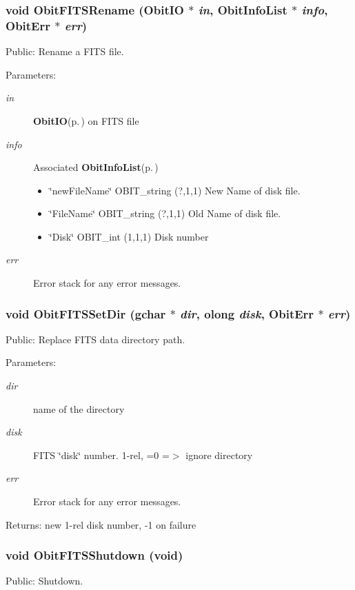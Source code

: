 \subsubsection{\setlength{\rightskip}{0pt plus 5cm}void Obit\-FITSRename ({\bf Obit\-IO} $\ast$ {\em in}, {\bf Obit\-Info\-List} $\ast$ {\em info}, {\bf Obit\-Err} $\ast$ {\em err})}\label{ObitFITS_8h_a11}


Public: Rename a FITS file. 

\begin{Desc}
\item[Parameters:]
\begin{description}
\item[{\em in}]{\bf Obit\-IO}{\rm (p.\,\pageref{structObitIO})} on FITS file \item[{\em info}]Associated {\bf Obit\-Info\-List}{\rm (p.\,\pageref{structObitInfoList})} \begin{itemize}
\item \char`\"{}new\-File\-Name\char`\"{} OBIT\_\-string (?,1,1) New Name of disk file. \item \char`\"{}File\-Name\char`\"{} OBIT\_\-string (?,1,1) Old Name of disk file. \item \char`\"{}Disk\char`\"{} OBIT\_\-int (1,1,1) Disk number \end{itemize}
\item[{\em err}]Error stack for any error messages. \end{description}
\end{Desc}
\subsubsection{\setlength{\rightskip}{0pt plus 5cm}void Obit\-FITSSet\-Dir (gchar $\ast$ {\em dir}, {\bf olong} {\em disk}, {\bf Obit\-Err} $\ast$ {\em err})}\label{ObitFITS_8h_a6}


Public: Replace FITS data directory path. 

\begin{Desc}
\item[Parameters:]
\begin{description}
\item[{\em dir}]name of the directory \item[{\em disk}]FITS \char`\"{}disk\char`\"{} number. 1-rel, =0 =$>$ ignore directory \item[{\em err}]Error stack for any error messages. \end{description}
\end{Desc}
\begin{Desc}
\item[Returns:]new 1-rel disk number, -1 on failure \end{Desc}
\subsubsection{\setlength{\rightskip}{0pt plus 5cm}void Obit\-FITSShutdown (void)}\label{ObitFITS_8h_a4}


Public: Shutdown. 

